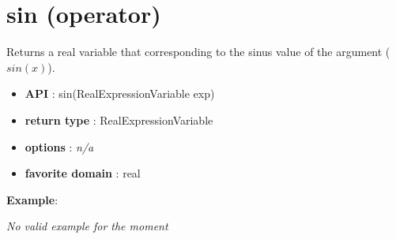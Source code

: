 \label{sin}
\hypertarget{sin}{}

\section{sin (operator)}\label{sin:sinoperator}\hypertarget{sin:sinoperator}{}
Returns a real variable that corresponding to the sinus value of the argument (\(sin(x)\)).

\begin{itemize}
	\item \textbf{API} : sin(RealExpressionVariable exp)
	\item \textbf{return type} : RealExpressionVariable
	\item \textbf{options} : \emph{n/a}
	\item \textbf{favorite domain} : real
\end{itemize}

\textbf{Example}:

\emph{No valid example for the moment}
